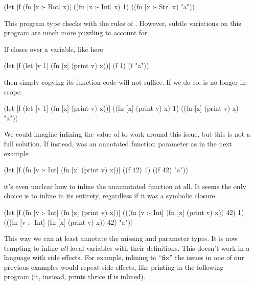\begin{cljlisting}
(let [f (fn [x :- Bot] x)]
  ((fn [x :- Int] x) 1)
  ((fn [x :- Str] x) "a"))
\end{cljlisting}

This program type checks with the rules of \ltiFsub.
However, subtle variations on this program are much
more puzzling to account for.

If  closes over a variable, like 
here

\begin{cljlisting}
(let [f (let [v 1] (fn [x] (print v) x))]
  (f 1)
  (f "a"))
\end{cljlisting}

then simply copying its function code will
not suffice.
If we do so,  is no longer in scope:

\begin{cljlisting}
(let [f (let [v 1] (fn [x] (print v) x))]
  ((fn [x] (print v) x) 1)
  ((fn [x] (print v) x) "a"))
\end{cljlisting}

We could imagine inlining the value of 
 to work around this issue, but this is not a
full solution.
If instead,  was an annotated function parameter
as in the next example

\begin{cljlisting}
(let [f (fn [v :- Int]
          (fn [x] (print v) x))]
  ((f 42) 1)
  ((f 42) "a"))
\end{cljlisting}

it's even unclear how to inline the
unannotated function at all.
It seems the only choice is to inline 
in its entirety, regardless if it was a symbolic closure.

\begin{cljlisting}
(let [f (fn [v :- Int]
          (fn [x] (print v) x))]
  (((fn [v :- Int]
      (fn [x] (print v) x))
    42)
   1)
  (((fn [v :- Int]
      (fn [x] (print v) x))
    42)
   "a"))
\end{cljlisting}

This way we can at least annotate the missing  and 
parameter types.
It is now tempting to inline \emph{all} local variables with their
definitions.
This doesn't work in a language with side effects.
For example, inlining  to ``fix'' the issues
in one of our previous examples would repeat side
effects, like printing  in the following
program (it, instead, prints thrice if  is inlined).

